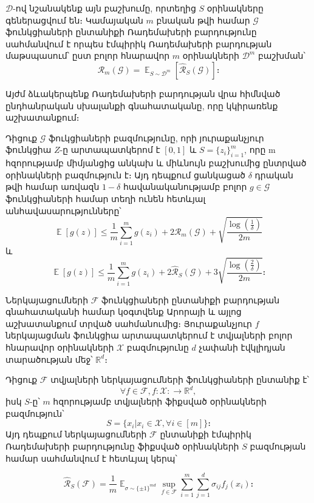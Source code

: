 \documentclass[12pt]{article}
\DeclareMathOperator*{\E}{\mathbb{E}}
\begin{document}
\begin{defination}
$\mathcal{D}$-ով նշանակենք այն բաշխումը, որտեղից $S$ օրինակները գեներացվում են։ Կամայական $m$ բնական թվի համար $\mathcal{G}$ ֆունկցիաների ընտանիքի Ռադեմախերի բարդությունը սահմանվում է որպես էմպիրիկ Ռադեմախերի բարդության մաթսպասում՝ ըստ բոլոր հնարավոր $m$ օրինակների $\mathcal{D}^m$ բաշխման՝
$$\mathcal{R}_m(\mathcal{G}) = \E_{S \sim \mathcal{D}^m} \left [     \hat{\mathcal{R}}_S(\mathcal{G})  \right]։$$
\end{defination}
Այժմ ձևակերպենք Ռադեմախերի բարդության վրա հիմնված ընդհանրական սխալանքի գնահատականը, որը կկիրառենք աշխատանքում։ 
\begin{theorem}
\label{rad_comp_th}
Դիցուք $\mathcal{G}$ ֆուկցիաների բազմությունը, որի յուրաքանչյուր ֆունկցիա  $Z$-ը արտապատկերոմ է $[0, 1]$ և $S = \{z_i\}_{i=1}^m$, որը m հզորությամբ միմյանցից անկախ և միևնույն բաշխումից ընտրված օրինակների բազմություն է։ Այդ դեպքում ցանկացած $\delta$ դրական թվի համար առվազն $1 - \delta$ հավանականությամբ բոլոր $g \in \mathcal{G}$ ֆունկցիաների համար տեղի ունեն հետևյալ անհավասարությունները՝
\begin{equation}
\E[g(z)] \leq \frac{1}{m}\sum_{i=1}^mg(z_i) + 2\mathcal{R}_m(\mathcal{G}) + \sqrt{\frac{\log\left( \frac{1}{\delta} \right)}{2m}}
\end{equation}
և
\begin{equation}
\E[g(z)] \leq \frac{1}{m}\sum_{i=1}^mg(z_i) + 2\hat{\mathcal{R}}_S(\mathcal{G}) + 3\sqrt{\frac{\log \left( \frac{2}{\delta} \right)}{2m}}։
\end{equation}
\end{theorem}


Ներկայացումների $\mathcal{F}$ ֆունկցիաների ընտանիքի բարդության գնահատականի համար կօգտվենք Արորայի և այլոց աշխատանքում տրված սահմանումից։ Յուրաքանչյուր $f$ ներկայացման ֆունկցիա արտապատկերում է տվյալների բոլոր հնարավոր օրինակների $\mathcal{X}$ բազմությունը $d$ չափանի էվկլիդյան տարածության մեջ՝ $\mathbb{R}^d$։

\begin{defination} Դիցուք $\mathcal{F}$ տվյալների ներկայացումների ֆունկցիաների ընտանիք է՝ $$\forall f \in \mathcal{F}, f:\mathcal{X}: \rightarrow \mathbb{R}^d,$$
իսկ $S$-ը՝ $m$ հզորությամբ տվյալների ֆիքսված օրինակների բազմություն՝
$$S = \{x_i | x_i \in \mathcal{X}, \forall i \in [m]\}։$$
Այդ դեպքում ներկայացումների $\mathcal{F}$ ընտանիքի էմպիրիկ Ռադեմախերի բարդությունը ֆիքսված օրինակների $S$ բազմության համար սահմանվում է հետևյալ կերպ՝

$$\hat{\mathcal{R}}_S(\mathcal{F}) = \frac{1}{m} \E_{\sigma \sim \{\pm 1\}^{md}} \sup_{f\in \mathcal{F}} \sum_{i = 1}^m \sum_{j = 1}^d \sigma_{ij} f_j(x_i)։$$

\end{defination}
\end{document}
